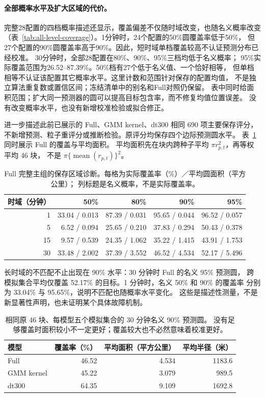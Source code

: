 \documentclass[UTF8,11pt]{ctexart}
\begin{document}
\paragraph{全部概率水平及扩大区域的代价。}
完整28配置的四档概率描述还显示，覆盖偏差不仅随时域改变，也随名义概率改变
（表~\ref{tab:all-level-coverage}）。1分钟时，24个配置的50\%圆覆盖率低于50\%，
但27个配置的90\%圆覆盖率高于90\%。因此，短时域单档覆盖较高不认证预测分布已经校准。
30分钟时，全部28配置在80\%、90\%、95\%三档均低于名义概率；
95\%实际覆盖范围为26.52--87.39\%。50\%档有27个低于名义值、一个恰好相等，
但单档相等不认证该配置其它概率水平。这里计数和范围针对保存的配置均值，
不是独立算法重复数或置信区间；冻结清单中的别名和Full对照仍保留。
表中同时给面积范围；扩大同一预测器的圆可以提高目标包含率，而不修复均值位置误差。
没有改变概率水平，也没有新增校准检验或拟合修正。

进一步描述此前已展示的 Full、GMM kernel、dt300 相同 690 项主要保存评分，
不新增预测、粒子重评分或推断检验。原评分均保存四个边际预测圆水平。
表~\ref{tab:full-calibration-area} 同时展示 Full 的覆盖与平均面积。
平均面积先在块内跨种子平均 \(\pi r_{p,t}^2\)，再等权平均 46 块，
不是 \(\pi\{\operatorname{mean}(r_{p,t})\}^2\)。

\begin{table}[htbp]
\centering\small
\caption{Full 完整主组的保存区域诊断。每格为实际覆盖率（\%）／平均圆面积（平方公里）；
列标题是名义概率，不是实际覆盖率。}
\label{tab:full-calibration-area}
\begin{tabular}{rrrrr}
\toprule
时域（分钟） & 50\% & 80\% & 90\% & 95\%\\
\midrule
1 & 33.04 / 0.013 & 87.39 / 0.031 & 95.65 / 0.044 & 96.52 / 0.057\\
5 & 6.52 / 0.094 & 25.65 / 0.210 & 37.83 / 0.294 & 50.43 / 0.378\\
15 & 9.57 / 0.539 & 24.35 / 1.062 & 35.22 / 1.415 & 43.91 / 1.753\\
30 & 33.48 / 2.002 & 37.39 / 3.552 & 46.52 / 4.534 & 52.17 / 5.496\\
\bottomrule
\end{tabular}
\end{table}

长时域的不匹配不止出现在 90\% 水平：30 分钟时 Full 的名义 95\% 预测圆，
跨模拟集合平均仅覆盖 52.17\% 的目标。1 分钟时，名义 50\% 和 90\% 的覆盖率
分别为 33.04\% 与 95.65\%，说明不匹配也随概率水平变化。
这些是描述性测量，不是新显著性声明，也未证明某个具体故障机制。

\begin{table}[htbp]
\centering\small
\caption{相同原 46 块、每模型五个模拟集合的 30 分钟名义 90\% 预测圆。
没有足够覆盖时面积较小不一定更好；覆盖较大也不必然意味着校准更好。}
\label{tab:model-region-size}
\begin{tabular}{lrrr}
\toprule
模型 & 覆盖率（\%） & 平均面积（平方公里） & 平均半径（米）\\
\midrule
Full & 46.52 & 4.534 & 1183.6\\
GMM kernel & 45.22 & 3.079 & 989.5\\
dt300 & 64.35 & 9.109 & 1692.8\\
\bottomrule
\end{tabular}
\end{table}
\end{document}
